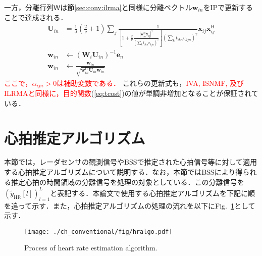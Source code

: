 一方，分離行列$\mathsf{W}$は節\ref{sec:conv:ilrma}と同様に分離ベクトル$\bm{w}_{in}$をIPで更新することで達成される．
\begin{align}
    \bm{U}_{in}&=\frac{1}{J}\left(\frac{2}{\nu}+1\right)\sum_{j}\frac{1}{\left\lbrack1+\frac{2}{\nu}\frac{|\bm{w}_{in}^{\mathrm{H}}\bm{x}_{ij}|^2}{\left(\sum_{k}t_{ikn}v_{kjn}\right)^{2}}\right\rbrack\left(\sum_{k}t_{ikn}v_{kjn}\right)^{2}}\bm{x}_{ij}\bm{x}_{ij}^{\mathrm{H}} \label{eq:tip1} \\
    \bm{w}_{in}&\leftarrow\left(\bm{W}_{i}\bm{U}_{in}\right)^{-1}\bm{e}_{n} \label{eq:tip2} \\
    \bm{w}_{in}&\leftarrow\frac{\bm{w}_{in}}{\sqrt{\bm{w}_{in}^{\mathrm{H}}\bm{U}_{in}\bm{w}_{in}}} \label{eq:tip3}
\end{align}
\textcolor{red}{ここで，$\alpha_{ijn}>0$は補助変数である．}
これらの更新式も，\textcolor{red}{IVA, ISNMF, 及びILRMAと同様に，目的関数}(\ref{eq:tcost})の値が単調非増加となることが保証されている．


\section{心拍推定アルゴリズム}
\label{sec:conv:heartrateestalgo}

本節では，レーダセンサの観測信号やBSSで推定された心拍信号等に対して適用する心拍推定アルゴリズムについて説明する．なお，本節ではBSSにより得られる推定心拍の時間領域の分離信号を処理の対象としている．この分離信号を$( \tilde{y}_\mathrm{HR}[l] )_{l=1}^L$と表記する．本論文で使用する心拍推定アルゴリズムを下記に順を追って示す．また，心拍推定アルゴリズムの処理の流れを以下にFig.~\ref{fig:hralgo}として示す．

\begin{figure}[tb]
\centering
\texttt{[image: ./ch\_conventional/fig/hralgo.pdf]}
\caption{Process of heart rate estimation algorithm.}
\label{fig:hralgo}
\end{figure}

